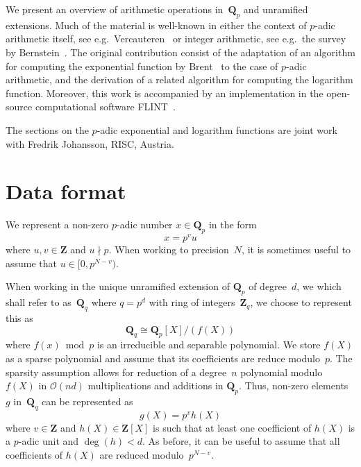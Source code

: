 We present an overview of arithmetic operations in~$\mathbf{Q}_p$ 
and unramified extensions.  Much of the material is well-known in 
either the context of $p$-adic arithmetic itself, see e.g.\ 
Vercauteren~\citep[\S 12]{HEHCC2005} or integer arithmetic, 
see e.g.\ the survey by Bernstein~\citep{Bernstein2008}. 
The original contribution consist of the adaptation of an algorithm 
for computing the exponential function by Brent~\citep{Brent1976} 
to the case of $p$-adic arithmetic, and the derivation of a related 
algorithm for computing the logarithm function.  Moreover, this 
work is accompanied by an implementation in the open-source computational 
software {\sc FLINT}~\citep{FLINT}.

The sections on the $p$-adic exponential and logarithm functions 
are joint work with Fredrik Johansson, RISC, Austria.

\section{Data format}

We represent a non-zero $p$-adic number $x \in \mathbf{Q}_p$ in the form 
\begin{equation}
x = p^v u
\end{equation}
where $u, v \in \mathbf{Z}$ and $u \nmid p$.  When working to precision~$N$, 
it is sometimes useful to assume that $u \in [0,p^{N-v})$.

When working in the unique unramified extension of $\mathbf{Q}_p$ of 
degree~$d$, we which shall refer to as~$\mathbf{Q}_q$ where $q = p^d$ 
with ring of integers~$\mathbf{Z}_q$, we choose to represent this as 
\begin{equation}
\mathbf{Q}_q \cong \mathbf{Q}_p[X] / (f(X))
\end{equation}
where $f(x) \bmod p$ is an irreducible and separable polynomial.  We store 
$f(X)$ as a sparse polynomial and assume that its coefficients are 
reduce modulo~$p$.  The sparsity assumption allows for reduction of a 
degree~$n$ polynomial modulo~$f(X)$ in $\mathcal{O}(nd)$ multiplications 
and additions in $\mathbf{Q}_p$.  Thus, non-zero elements~$g$ 
in~$\mathbf{Q}_q$ can be represented as 
\begin{equation}
g(X) = p^v h(X)
\end{equation}
where $v \in \mathbf{Z}$ and $h(X) \in \mathbf{Z}[X]$ is such that at least 
one coefficient of $h(X)$ is a $p$-adic unit and $\deg(h) < d$.  As before, 
it can be useful to assume that all coefficients of $h(X)$ are reduced 
modulo~$p^{N-v}$.

